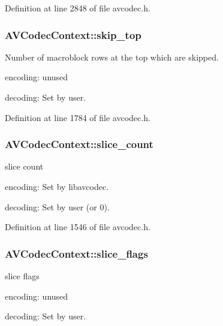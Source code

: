 Definition at line 2848 of file avcodec.\+h.

\subsubsection[{\texorpdfstring{skip\+\_\+top}{skip_top}}]{ A\+V\+Codec\+Context\+::skip\+\_\+top}\hypertarget{struct_a_v_codec_context_a023de607be08e4e8e9b15349f3a1f446}{}\label{struct_a_v_codec_context_a023de607be08e4e8e9b15349f3a1f446}
Number of macroblock rows at the top which are skipped.
\begin{DoxyItemize}
\item encoding\+: unused
\item decoding\+: Set by user. 
\end{DoxyItemize}

Definition at line 1784 of file avcodec.\+h.

\subsubsection[{\texorpdfstring{slice\+\_\+count}{slice_count}}]{ A\+V\+Codec\+Context\+::slice\+\_\+count}\hypertarget{struct_a_v_codec_context_a5ab4f688d837387c83315fba6027a43a}{}\label{struct_a_v_codec_context_a5ab4f688d837387c83315fba6027a43a}
slice count
\begin{DoxyItemize}
\item encoding\+: Set by libavcodec.
\item decoding\+: Set by user (or 0). 
\end{DoxyItemize}

Definition at line 1546 of file avcodec.\+h.

\subsubsection[{\texorpdfstring{slice\+\_\+flags}{slice_flags}}]{ A\+V\+Codec\+Context\+::slice\+\_\+flags}\hypertarget{struct_a_v_codec_context_a2ce5f24ee2312281a68b40428b384bc8}{}\label{struct_a_v_codec_context_a2ce5f24ee2312281a68b40428b384bc8}
slice flags
\begin{DoxyItemize}
\item encoding\+: unused
\item decoding\+: Set by user. 
\end{DoxyItemize}

